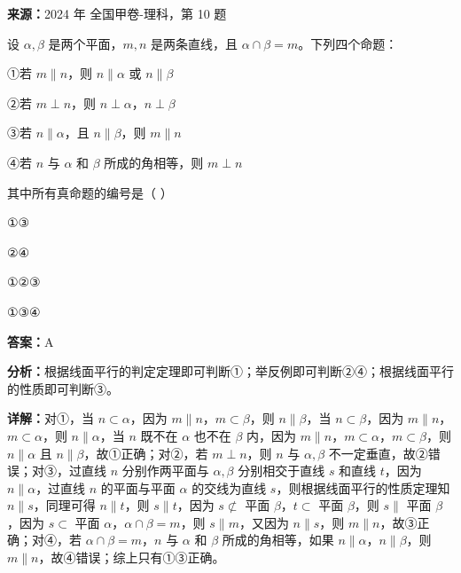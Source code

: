 \begin{question}[points=5]
\textbf{来源：}2024 年 全国甲卷-理科，第 10 题\par
设 $\alpha,\beta$ 是两个平面，$m,n$ 是两条直线，且 $\alpha\cap\beta=m$。下列四个命题：

①若 $m\parallel n$，则 $n\parallel\alpha$ 或 $n\parallel\beta$

②若 $m\perp n$，则 $n\perp\alpha$，$n\perp\beta$

③若 $n\parallel\alpha$，且 $n\parallel\beta$，则 $m\parallel n$

④若 $n$ 与 $\alpha$ 和 $\beta$ 所成的角相等，则 $m\perp n$

其中所有真命题的编号是（   ）
\begin{choices}
  \item ①③
  \item ②④
  \item ①②③
  \item ①③④
\end{choices}
\begin{solution}
\textbf{答案：}A

\textbf{分析：}根据线面平行的判定定理即可判断①；举反例即可判断②④；根据线面平行的性质即可判断③。

\textbf{详解：}对①，当 $n\subset\alpha$，因为 $m\parallel n$，$m\subset\beta$，则 $n\parallel\beta$，当 $n\subset\beta$，因为 $m\parallel n$，$m\subset\alpha$，则 $n\parallel\alpha$，当 $n$ 既不在 $\alpha$ 也不在 $\beta$ 内，因为 $m\parallel n$，$m\subset\alpha$，$m\subset\beta$，则 $n\parallel\alpha$ 且 $n\parallel\beta$，故①正确；对②，若 $m\perp n$，则 $n$ 与 $\alpha,\beta$ 不一定垂直，故②错误；对③，过直线 $n$ 分别作两平面与 $\alpha,\beta$ 分别相交于直线 $s$ 和直线 $t$，因为 $n\parallel\alpha$，过直线 $n$ 的平面与平面 $\alpha$ 的交线为直线 $s$，则根据线面平行的性质定理知 $n\parallel s$，同理可得 $n\parallel t$，则 $s\parallel t$，因为 $s\not\subset$ 平面 $\beta$，$t\subset$ 平面 $\beta$，则 $s\parallel$ 平面 $\beta$，因为 $s\subset$ 平面 $\alpha$，$\alpha\cap\beta=m$，则 $s\parallel m$，又因为 $n\parallel s$，则 $m\parallel n$，故③正确；对④，若 $\alpha\cap\beta=m$，$n$ 与 $\alpha$ 和 $\beta$ 所成的角相等，如果 $n\parallel\alpha$，$n\parallel\beta$，则 $m\parallel n$，故④错误；综上只有①③正确。
\end{solution}
\end{question}

